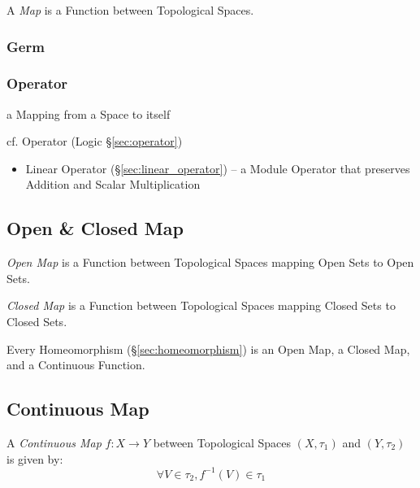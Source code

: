 A \emph{Map} is a Function between Topological Spaces.



\subsubsection{Germ}\label{sec:germ}

\subsubsection{Operator}\label{sec:space_operator}

a Mapping from a Space to itself

cf. Operator (Logic \S\ref{sec:operator})

\begin{itemize}
  \item Linear Operator (\S\ref{sec:linear_operator}) -- a Module Operator that
    preserves Addition and Scalar Multiplication
\end{itemize}



\subsection{Open \& Closed Map}\label{sec:open_closed_map}

\emph{Open Map} is a Function between Topological Spaces mapping Open
Sets to Open Sets.

\emph{Closed Map} is a Function between Topological Spaces mapping Closed
Sets to Closed Sets.

Every Homeomorphism (\S\ref{sec:homeomorphism}) is an Open Map, a
Closed Map, and a Continuous Function.



\subsection{Continuous Map}\label{sec:continuous_map}

A \emph{Continuous Map} $f : X \rightarrow Y$ between Topological Spaces
$(X,\tau_1)$ and $(Y,\tau_2)$ is given by:
\[
  \forall V \in \tau_2, f^{-1}(V) \in \tau_1
\]

